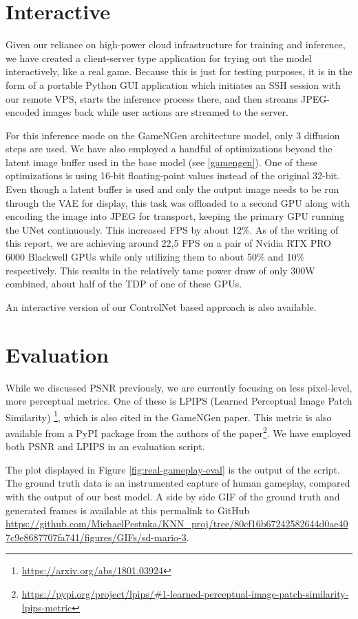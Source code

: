 \documentclass[twocolumn,a4paper]{article}
\begin{document}
\section{Interactive}

Given our reliance on high-power cloud infrastructure for training and inference, we have created a client-server type application for trying out the model interactively, like a real game. Because this is just for testing purposes, it is in the form of a portable Python GUI application which initiates an SSH session with our remote VPS, starts the inference process there, and then streams JPEG-encoded images back while user actions are streamed to the server.

For this inference mode on the GameNGen architecture model, only 3 diffusion steps are used. We have also employed a handful of optimizations beyond the latent image buffer used in the base model (see \ref{gamengen}). One of these optimizations is using 16-bit floating-point values instead of the original 32-bit. Even though a latent buffer is used and only the output image needs to be run through the VAE for display, this task was offloaded to a second GPU along with encoding the image into JPEG for transport, keeping the primary GPU running the UNet continuously. This increased FPS by about 12\%. As of the writing of this report, we are achieving around 22,5 FPS on a pair of Nvidia RTX PRO 6000 Blackwell GPUs while only utilizing them to about 50\% and 10\% respectively. This results in the relatively tame power draw of only 300W combined, about half of the TDP of one of these GPUs.

An interactive version of our ControlNet based approach is also available.

\section{Evaluation} \label{eval}

While we discussed PSNR previously, we are currently focusing on less pixel-level, more perceptual metrics. One of these is LPIPS (Learned Perceptual Image Patch Similarity) \footnote{\url{https://arxiv.org/abs/1801.03924}}, which is also cited in the GameNGen paper. This metric is also available from a PyPI package from the authors of the paper\footnote{\url{https://pypi.org/project/lpips/\#1-learned-perceptual-image-patch-similarity-lpips-metric}}. We have employed both PSNR and LPIPS in an evaluation script.

The plot displayed in Figure \ref{fig:real-gameplay-eval} is the output of the script. The ground truth data is an instrumented capture of human gameplay, compared with the output of our best model. A side by side GIF of the ground truth and generated frames is available at this permalink to GitHub \url{https://github.com/MichaelPestuka/KNN_proj/tree/80cf16b67242582644d0ae407c9e8687707fa741/figures/GIFs/sd-mario-3}.
\end{document}
